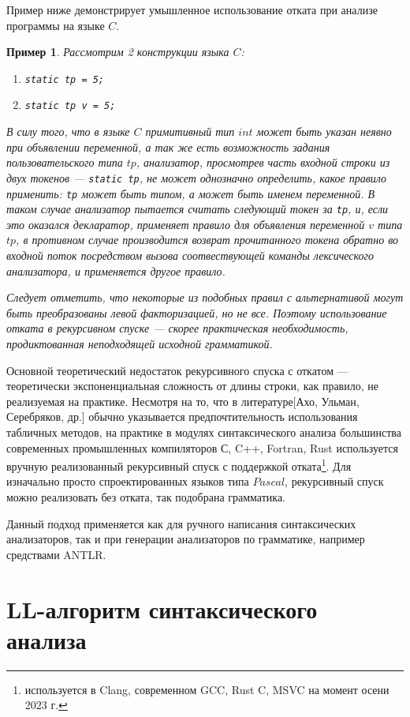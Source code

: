 \documentclass[10pt]{article}         %
\newtheorem{example}{Пример}
\begin{document}
	Пример ниже демонстрирует умышленное использование отката при анализе программы на языке $C$.
	\begin{example}
	Рассмотрим 2 конструкции языка $C$:
	\begin{enumerate}
		\item \verb|static tp = 5;|
		\item \verb|static tp v = 5;|
	\end{enumerate}
	В силу того, что в языке $C$ примитивный тип $int$ может быть указан неявно при объявлении переменной, а так же есть возможность задания пользовательского типа $tp$, анализатор, просмотрев часть входной строки из двух токенов --- \verb|static tp|, не может однозначно определить, какое правило применить: \verb|tp| может быть типом, а может быть именем переменной. В таком случае анализатор пытается считать следующий токен за \verb|tp|, и, если это оказался декларатор, применяет правило для объявления переменной $v$ типа $tp$, в противном случае производится возврат прочитанного токена обратно во входной поток посредством вызова соотвествующей команды лексического анализатора, и применяется другое правило.
	
	Следует отметить, что некоторые из подобных правил с альтернативой могут быть преобразованы левой факторизацией, но не все. Поэтому использование отката в рекурсивном спуске --- скорее практическая необходимость, продиктованная неподходящей исходной грамматикой.
	
	\end{example}
	Основной теоретический недостаток рекурсивного спуска с откатом --- теоретически экспоненциальная сложность от длины строки, как правило, не реализуемая на практике.
	Несмотря на то, что в литературе[Ахо, Ульман, Серебряков, др.] обычно указывается предпочтительность использования табличных методов, на практике в модулях синтаксического анализа большинства современных промышленных компиляторов С, C++, Fortran, Rust используется вручную реализованный рекурсивный спуск с поддержкой отката\footnote{используется в Clang, современном GCC, Rust C, MSVC на момент осени 2023 г.}. Для изначально просто спроектированных языков типа $Pascal$, рекурсивный спуск можно реализовать без отката, так подобрана грамматика.
	
	Данный подход применяется как для ручного написания синтаксических анализаторов, так и при генерации анализаторов по грамматике, например средствами ANTLR. 
	
	\section{LL-алгоритм синтаксического анализа}
	
\end{document}
